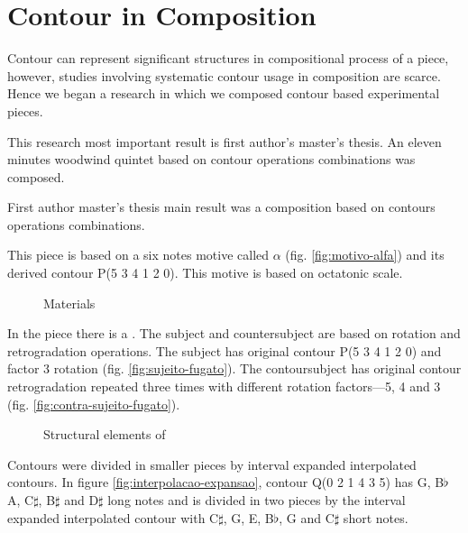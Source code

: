 \section{Contour in Composition}
\label{sec:contour-composition}

Contour can represent significant structures in compositional process
of a piece, however, studies involving systematic contour usage in
composition are scarce. Hence we began a research in which we composed
contour based experimental pieces.

This research most important result is first author's master's thesis.
An eleven minutes woodwind quintet based on contour operations
combinations was composed.

First author master's thesis main result was a composition based on
contours operations combinations.

This piece is based on a six notes motive called $\alpha$
(fig. \ref{fig:motivo-alfa}) and its derived contour P(5 3 4 1 2
0). This motive is based on octatonic scale.

\begin{figure}[!p]
  \centering
  \subfloat[P(5 3 4 1 2 0) contour]{
    \texttt{[image: c-534120]}
    \label{fig:c-534120}
  }
  \caption{Materials}
  \label{fig:materials}
\end{figure}

In the piece there is a . The subject and countersubject
are based on rotation and retrogradation operations. The subject has
original contour P(5 3 4 1 2 0) and factor 3 rotation
(fig. \ref{fig:sujeito-fugato}). The contoursubject has original
contour retrogradation repeated three times with different rotation
factors---5, 4 and 3 (fig. \ref{fig:contra-sujeito-fugato}).

\begin{figure}
  \centering

  \caption{Structural elements of }
  \label{fig:elementos-fugato}
\end{figure}

Contours were divided in smaller pieces by interval expanded
interpolated contours. In figure \ref{fig:interpolacao-expansao},
contour Q(0 2 1 4 3 5) has G, B$\flat$ A, C$\sharp$, B$\sharp$ and
D$\sharp$ long notes and is divided in two pieces by the interval
expanded interpolated contour with C$\sharp$, G, E, B$\flat$, G and
C$\sharp$ short notes.


